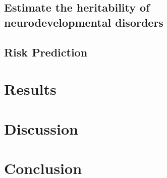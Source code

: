 \subsection{Estimate the heritability of neurodevelopmental disorders}
\subsection{Risk Prediction}
\section{Results}

\section{Discussion}



\section{Conclusion}